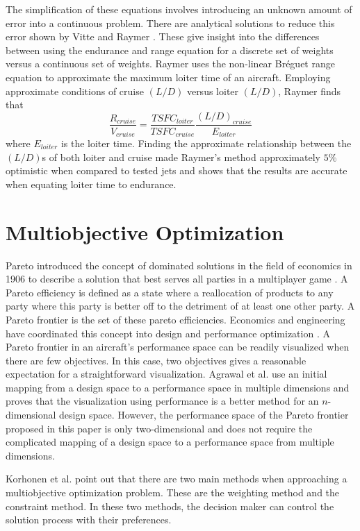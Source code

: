 \par 
The simplification of these equations involves introducing an unknown amount of error into a continuous problem. There are analytical solutions to reduce this error shown by Vitte \cite{OptimizeBreguet} and Raymer \cite{LoiterTimeFromRange}. These give insight into the differences between using the endurance and range equation for a discrete set of weights versus a continuous set of weights. Raymer \cite{LoiterTimeFromRange} uses the non-linear Br\'eguet range equation to approximate the maximum loiter time of an aircraft. Employing approximate conditions of cruise $(L/D)$ versus loiter $(L/D)$, Raymer \cite{LoiterTimeFromRange} finds that 
\begin{equation}
    \dfrac{R_{cruise}}{V_{cruise}} = \dfrac{TSFC_{loiter}}{TSFC_{cruise}}\dfrac{(L/D)_{cruise}}{E_{loiter}}
\end{equation}
where $E_{loiter}$ is the loiter time. Finding the approximate relationship between the $(L/D)$s of both loiter and cruise made Raymer's method approximately $5\%$ optimistic when compared to tested jets and shows that the results are accurate when equating loiter time to endurance.
\section{Multiobjective Optimization}
Pareto introduced the concept of dominated solutions in the field of economics in 1906 to describe a solution that best serves all parties in a multiplayer game \cite{paretomanual}. A Pareto efficiency is defined as a state where a reallocation of products to any party where this party is better off to the detriment of at least one other party. A Pareto frontier is the set of these pareto efficiencies. Economics and engineering have coordinated this concept into design and performance optimization \cite{surveyMarler}. A Pareto frontier in an aircraft's performance space can be readily visualized when there are few objectives. In this case, two objectives gives a reasonable expectation for a straightforward visualization. Agrawal et al. \cite{MultiobjectiveVisualization} use an initial mapping from a design space to a performance space in multiple dimensions and proves that the visualization using performance is a better method for an $n$-dimensional design space. However, the performance space of the Pareto frontier proposed in this paper is only two-dimensional and does not require the complicated mapping of a design space to a performance space from multiple dimensions. 
\par
Korhonen et al. \cite{MultOptCS} point out that there are two main methods when approaching a multiobjective optimization problem. These are the weighting method and the constraint method. In these two methods, the decision maker can control the solution process with their preferences.\par
